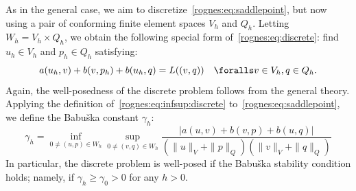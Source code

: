 As in the general case, we aim to
discretize~\eqref{rognes:eq:saddlepoint}, but now using a pair of
conforming finite element spaces $V_h$ and $Q_h$. Letting $W_h = V_h
\times Q_h$, we obtain the following special form
of~\eqref{rognes:eq:discrete}: find $u_h \in V_h$ and $p_h \in Q_h$
satisfying:
\begin{equation}
    \label{rognes:eq:saddlepoint:discrete}
    a(u_h, v) + b(v, p_h) + b(u_h, q) = L((v, q))
    \quad \foralls v \in V_h, q \in Q_h.
\end{equation}
Again, the well-posedness of the discrete problem follows from the
general theory. Applying the definition of~\eqref{rognes:eq:infsup:discrete}
to~\eqref{rognes:eq:saddlepoint}, we define the Babu\v ska constant
$\gamma_h$:
\begin{equation}
  \label{rognes:eq:Babuska}
  \gamma_h = \inf_{0 \not = (u, p) \in W_h} \sup_{0 \not = (v, q) \in W_h}
  \frac{|a(u, v) + b(v, p) + b(u, q)|} {(\|u\|_{V} + \|p\|_{Q})
    (\|v\|_{V} + \|q\|_{Q})}
\end{equation}
In particular, the discrete problem is well-posed if the Babu\v ska
stability condition holds; namely, if $\gamma_h \geq \gamma_0 > 0$ for
any $h > 0$.


